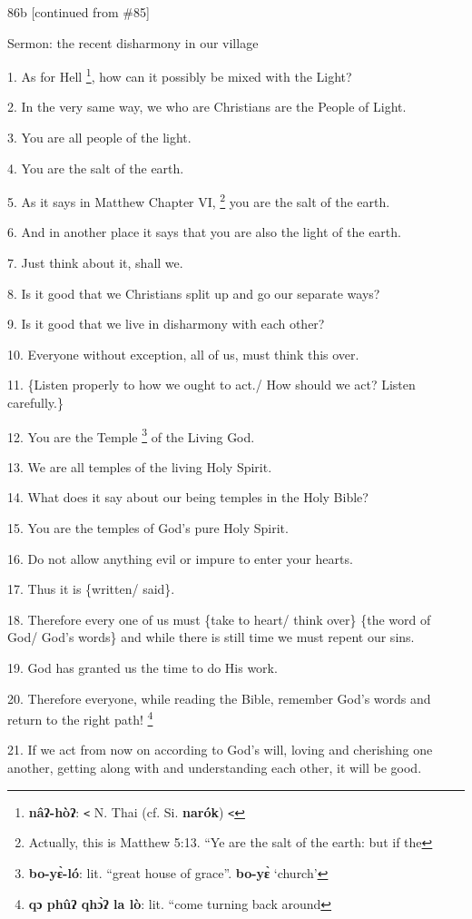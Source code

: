 
86b [continued from \#85]

Sermon: the recent disharmony in our village

1. As for Hell \footnote{\textbf{nâʔ-hòʔ}: \texttt{<} N. Thai (cf. Si. \textbf{narók}) \texttt{<}}, how can it possibly be mixed with the Light?

2. In the very same way, we who are Christians are the People of Light.

3. You are all people of the light.

4. You are the salt of the earth.

5. As it says in Matthew Chapter VI, \footnote{Actually, this is Matthew 5:13. ``Ye are the salt of the earth: but if the} you are the salt of the earth.

6. And in another place it says that you are also the light of the earth.

7. Just think about it, shall we.

8. Is it good that we Christians split up and go our separate ways?

9. Is it good that we live in disharmony with each other?

10. Everyone without exception, all of us, must think this over.

11. \{Listen properly to how we ought to act./ How should we act? Listen carefully.\}

12. You are the Temple \footnote{\textbf{bo-yɛ̀-ló}: lit. ``great house of grace''. \textbf{bo-yɛ̀} `church'} of the Living God.

13. We are all temples of the living Holy Spirit.

14. What does it say about our being temples in the Holy Bible?

15. You are the temples of God's pure Holy Spirit.

16. Do not allow anything evil or impure to enter your hearts.

17. Thus it is \{written/ said\}.

18. Therefore every one of us must \{take to heart/ think over\} \{the word of
God/ God's words\} and while there is still time we must repent our sins.

19. God has granted us the time to do His work.

20. Therefore everyone, while reading the Bible, remember God's words and return
to the right path! \footnote{\textbf{qɔ   phûʔ   qhɔ̀ʔ  la  lò}: lit. ``come turning back around}

21. If we act from now on according to God's will, loving and cherishing one another,
getting along with and understanding each other, it will be good.

